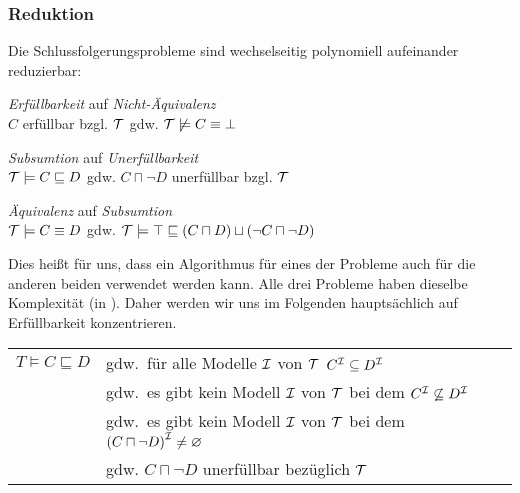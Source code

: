 \subsubsection{Reduktion}

Die Schlussfolgerungsprobleme sind wechselseitig polynomiell aufeinander reduzierbar:

\begin{lemma}\mbox{}\label{lem:problem-reduction}
\begin{enumerate}
\item{\emph{Erfüllbarkeit} auf \emph{Nicht-Äquivalenz} \\
$C$ erfüllbar bzgl. $\mathcal{T}$ gdw. $\mathcal{T} \not\models C \equiv \bot$}
\item{\emph{Subsumtion} auf \emph{Unerfüllbarkeit} \\
$\mathcal{T} \models C \sqsubseteq D$ gdw. $C \sqcap \neg D$ unerfüllbar bzgl.
$\mathcal{T}$
\item{\emph{Äquivalenz} auf \emph{Subsumtion} \\}
$\mathcal{T} \models C \equiv D$ gdw. $\MT \models \top \sqsubseteq \left( C \sqcap D \right) \sqcup \left( \neg C \sqcap \neg D \right)$}
\end{enumerate}
\end{lemma}

Dies heißt für uns, dass ein Algorithmus für eines der Probleme auch für die
anderen beiden verwendet werden kann. Alle drei Probleme haben dieselbe
Komplexität (in \ALC). Daher werden wir uns im Folgenden hauptsächlich auf
Erfüllbarkeit konzentrieren.

\begin{tafel}\mbox{}
    \begin{center} \begin{tabular}{ll}
        $T \models C \sqsubseteq D$ & gdw.\ für alle Modelle $\mathcal{I}$ von $\mathcal{T}$ $C^{\mathcal{I}} \subseteq D^{\mathcal{I}}$\\
                                    & gdw.\ es gibt kein Modell $\mathcal{I}$ von $\mathcal{T}$ bei dem $C^{\mathcal{I}} \not\subseteq D^{\mathcal{I}}$\\
                                    & gdw.\ es gibt kein Modell $\mathcal{I}$ von $\mathcal{T}$ bei dem ${(C \sqcap \neg D)}^{\mathcal{I}} \neq \varnothing$\\
                                    & gdw. $C \sqcap \neg D$ unerfüllbar bezüglich $\mathcal{T}$\\
    \end{tabular}
\end{center}
\end{tafel}

